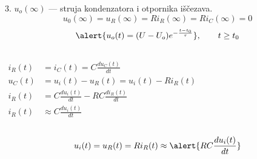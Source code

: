 \begin{frame}[label=08-s056]
\setlength{\parskip}{2pt}
\setlength{\abovedisplayskip}{4pt}\setlength{\belowdisplayskip}{4pt}
3. $u_o(\infty)$ — struja kondenzatora i otpornika iščezava.
\[u_0(\infty)=u_R(\infty)=Ri_R(\infty)=Ri_C(\infty)=0\]
\[\alert{u_o(t)=(U-U_o)e^{-\frac{t-t_0}{\tau}}},\qquad t\geq t_0\]
\begin{columns}[c,onlytextwidth]
\centering
{}
\begin{align*}
i_R(t)&=i_C(t)=C\frac{du_C(t)}{dt}\\
u_C(t)&=u_i(t)-u_R(t)=u_i(t)-Ri_R(t)\\
i_R(t)&=C\frac{du_i(t)}{dt}-RC\frac{di_R(t)}{dt}\\
i_R(t)&\approx C\frac{du_i(t)}{dt}
\end{align*}
\end{columns}
\[u_i(t)=u_R(t)=Ri_R(t)\approx\alert{RC\frac{du_i(t)}{dt}}\]
\end{frame}
